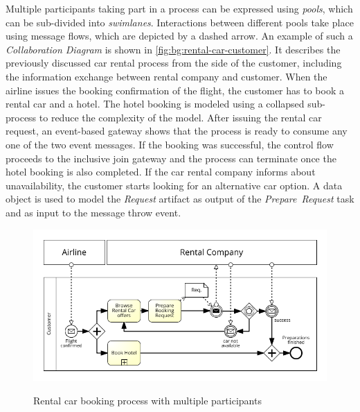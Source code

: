 Multiple participants taking part in a process can be expressed using \textit{pools}, which can be sub-divided into \textit{swimlanes}.
Interactions between different pools take place using message flows, which are depicted by a dashed arrow.
An example of such a \textit{Collaboration Diagram} is shown in \autoref{fig:bg:rental-car-customer}. It describes the previously discussed car rental process from the side of the customer, including the information exchange between rental company and customer.
When the airline issues the booking confirmation of the flight, the customer has to book a rental car and a hotel. The hotel booking is modeled using a collapsed sub-process to reduce the complexity of the model.
After issuing the rental car request, an event-based gateway shows that the process is ready to consume any one of the two event messages. If the booking was successful, the control flow proceeds to the inclusive join gateway and the process can terminate once the hotel booking is also completed. If the car rental company informs about unavailability, the customer starts looking for an alternative car option.
A data object is used to model the \textit{Request} artifact as output of the \textit{Prepare~Request} task and as input to the message throw event.

\begin{figure}[]
	\myfloatalign
	{\hspace*{-0.8cm}\includegraphics[width=1.1\linewidth]{chapters/background/intro-rental-car-customer.png}}
	\caption{Rental car booking process with multiple participants}
	\label{fig:bg:rental-car-customer}
\end{figure}


